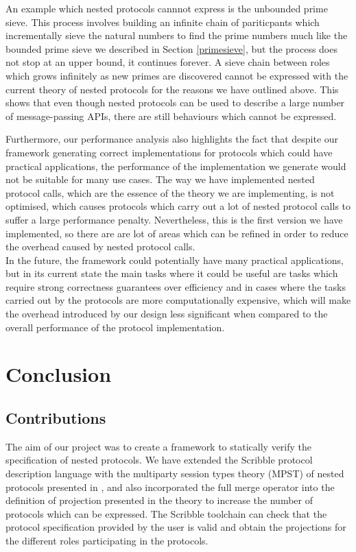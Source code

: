 \documentclass[12pt,twoside]{report}
\begin{document}
An example which nested protocols cannnot express is the unbounded prime sieve. This process involves building an infinite chain of pariticpants which incrementally sieve the natural numbers to find the prime numbers much like the bounded prime sieve we described in Section \ref{primesieve}, but the process does not stop at an upper bound, it continues forever. A sieve chain between roles which grows infinitely as new primes are discovered cannot be expressed with the current theory of nested protocols for the reasons we have outlined above. This shows that even though nested protocols can be used to describe a large number of message-passing APIs, there are still behaviours which cannot be expressed. 

Furthermore, our performance analysis also highlights the fact that despite our framework generating correct implementations for protocols which could have practical applications, the performance of the implementation we generate would not be suitable for many use cases. The way we have implemented nested protocol calls, which are the essence of the theory we are implementing, is not optimised, which causes protocols which carry out a lot of nested protocol calls to suffer a large performance penalty. Nevertheless, this is the first version we have implemented, so there are are lot of areas which can be refined in order to reduce the overhead caused by nested protocol calls.\\

In the future, the framework could potentially have many practical applications, but in its current state the main tasks where it could be useful are tasks which require strong correctness guarantees over efficiency and in cases where the  tasks carried out by the protocols are more computationally expensive, which will make the overhead introduced by our design less significant when compared to the overall performance of the protocol implementation.



\chapter{Conclusion}
\section{Contributions}
The aim of our project was to create a framework to statically verify the specification of nested protocols. We have extended the Scribble protocol description language\cite{scribble} with the multiparty session types theory (MPST) of nested protocols presented in \cite{nestedprotocols}, and also incorporated the full merge operator into the definition of projection presented in the theory to increase the number of protocols which can be expressed. The Scribble toolchain can check that the protocol specification provided by the user is valid and obtain the projections for the different roles participating in the protocols.\\
\end{document}

